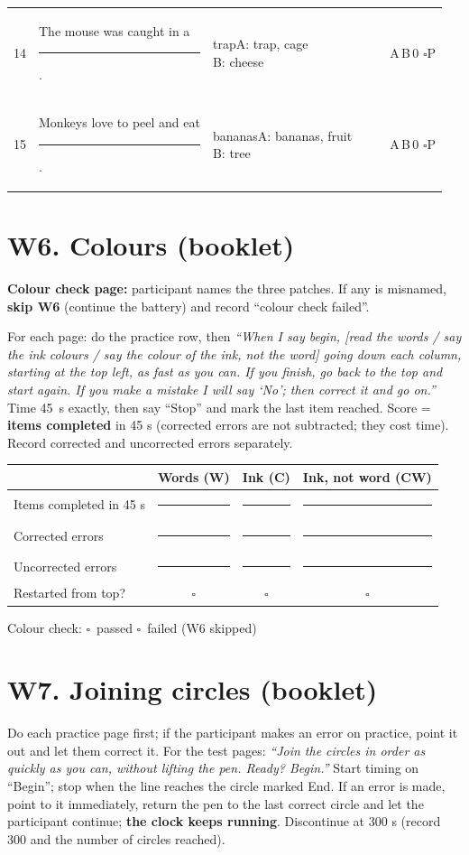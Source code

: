 \documentclass[10pt,a4paper]{article}
\newcommand{\blank}[1][1.2cm]{\rule{#1}{0.4pt}}
\newcommand{\bx}{$\square$}
\begin{document}
{\begin{longtable}{@{}r>{\raggedright\arraybackslash}p{7.2cm}>{\raggedright\arraybackslash}p{1.9cm}p{2.4cm}p{1.1cm}l@{}}
14 & The mouse was caught in a \rule{1.1cm}{0.4pt}. & trap\newline{\scriptsize A: trap, cage\newline B: cheese} & \blank[2.2cm] & \blank[0.9cm] & A\,B\,0 \bx P\\
15 & Monkeys love to peel and eat \rule{1.1cm}{0.4pt}. & bananas\newline{\scriptsize A: bananas, fruit\newline B: tree} & \blank[2.2cm] & \blank[0.9cm] & A\,B\,0 \bx P\\
\bottomrule\end{longtable}}
\section*{W6. Colours (booklet)}
\textbf{Colour check page:} participant names the three patches. If any is misnamed, \textbf{skip W6} (continue the battery) and record ``colour check failed''.

For each page: do the practice row, then \textit{``When I say begin, [read the words / say the ink colours / say the colour of the ink, not the word] going down each column, starting at the top left, as fast as you can. If you finish, go back to the top and start again. If you make a mistake I will say `No'; then correct it and go on.''} Time 45~s exactly, then say ``Stop'' and mark the last item reached.
Score = \textbf{items completed} in 45 s (corrected errors are not subtracted; they cost time). Record corrected and uncorrected errors separately.

\begin{tabular}{@{}lccc@{}}\toprule & Words (W) & Ink (C) & Ink, not word (CW)\\ \midrule
Items completed in 45 s & \blank & \blank & \blank\\ Corrected errors & \blank & \blank & \blank\\ Uncorrected errors & \blank & \blank & \blank\\ Restarted from top? & \bx & \bx & \bx\\ \bottomrule\end{tabular}

Colour check: \bx\ passed \quad \bx\ failed (W6 skipped)
\section*{W7. Joining circles (booklet)}
Do each practice page first; if the participant makes an error on practice, point it out and let them correct it. For the test pages: \textit{``Join the circles in order as quickly as you can, without lifting the pen. Ready? Begin.''} Start timing on ``Begin''; stop when the line reaches the circle marked End. If an error is made, point to it immediately, return the pen to the last correct circle and let the participant continue; \textbf{the clock keeps running}. Discontinue at 300 s (record 300 and the number of circles reached).
\end{document}
